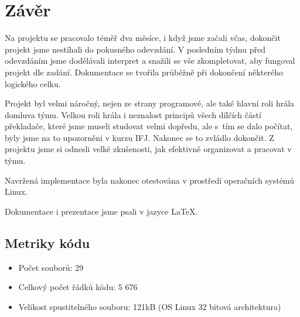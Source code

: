 \documentclass[a4paper, 11pt, titlepage]{article}
\begin{document}
\section{Závěr}
Na projektu se pracovalo téměř dva měsíce, i když jsme začali včas, dokončit projekt jsme nestíhali do pokusného odevzdání. V posledním týdnu před odevzdáním jsme dodělávali interpret a snažili se vše zkompletovat, aby fungoval projekt dle zadání. Dokumentace se tvořila průběžně při dokončení některého logického celku. 

Projekt byl velmi náročný, nejen ze strany programové, ale také hlavní roli hrála domluva týmu. Velkou roli hrála i neznalost principů všech dílčích částí překladače, které jsme museli studovat velmi dopředu, ale s~tím se dalo počítat, byly jsme na to upozorněni v kurzu IFJ. Nakonec se to zvládlo dokončit. Z projektu jsme si odnesli velké zkušenosti, jak efektivně organizovat a pracovat v týmu.

Navržená implementace byla nakonec otestována v prostředí operačních systémů Linux.

Dokumentace i prezentace jsme psali v jazyce \LaTeX. 

\subsection{Metriky kódu}
\begin{itemize}
	\item Počet souborů: 29
	\item Celkový počet řádků kódu: 5 676
	\item Velikost spustitelného souboru: 121kB (OS Linux 32 bitová architektura)
\end{itemize}  

\nocite{Ahoc2007}
\nocite{ifj_ial}

\end{document}
